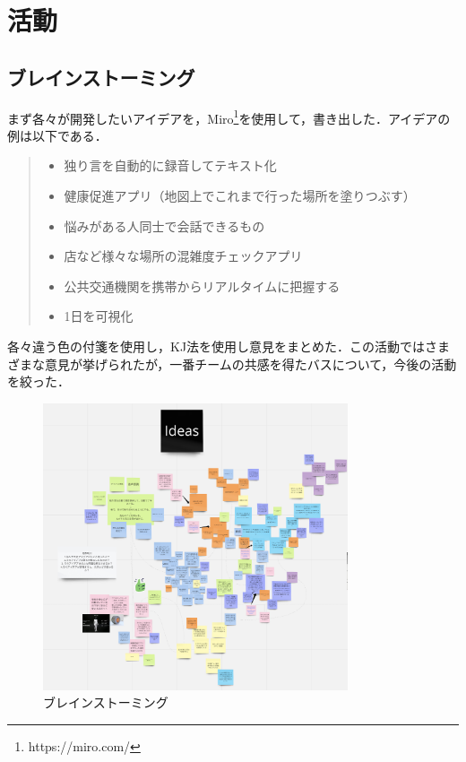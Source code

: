 \chapter{活動}
\section{ブレインストーミング}
まず各々が開発したいアイデアを，Miro\footnote{https://miro.com/}を使用して，書き出した．アイデアの例は以下である．

\begin{quote}
    \begin{itemize}
        \item 独り言を自動的に録音してテキスト化
        \item 健康促進アプリ（地図上でこれまで行った場所を塗りつぶす）
        \item 悩みがある人同士で会話できるもの
        \item 店など様々な場所の混雑度チェックアプリ
        \item 公共交通機関を携帯からリアルタイムに把握する
        \item 1日を可視化
    \end{itemize}
\end{quote}

各々違う色の付箋を使用し，KJ法を使用し意見をまとめた．この活動ではさまざまな意見が挙げられたが，一番チームの共感を得たバスについて，今後の活動を絞った．

\begin{figure}[htbp]
    \centering
    \includegraphics[width=9cm]{images/brainstorm.png}
    \caption{ブレインストーミング}
    \label{fig:brainstorm}
\end{figure}


